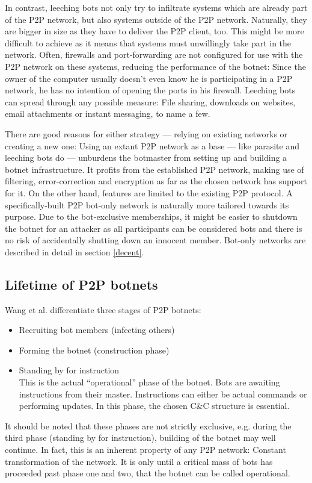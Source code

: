 \documentclass{llncs}
\begin{document}
In contrast, leeching bots not only try to infiltrate systems which
are already part of the P2P network, but also systems outside of the
P2P network. Naturally, they are bigger in size as they have to
deliver the P2P client, too. This might be more difficult to achieve
as it means that systems must unwillingly take part in the
network. Often, firewalls and port-forwarding are not configured for
use with the P2P network on these systems, reducing the performance of
the botnet: Since the owner of the computer usually doesn't even know
he is participating in a P2P network, he has no intention of opening
the ports in his firewall. Leeching bots can spread through any
possible measure: File sharing, downloads on websites, email
attachments or instant messaging, to name a few.

There are good reasons for either strategy --- relying on existing
networks or creating a new one: Using an extant P2P network as a base
--- like parasite and leeching bots do --- unburdens the botmaster
from setting up and building a botnet infrastructure. It profits from
the established P2P network, making use of filtering, error-correction
and encryption as far as the chosen network has support for it. On the
other hand, features are limited to the existing P2P protocol. A
specifically-built P2P bot-only network is naturally more tailored
towards its purpose. Due to the bot-exclusive memberships, it might be
easier to shutdown the botnet for an attacker as all participants can
be considered bots and there is no risk of accidentally shutting down
an innocent member. Bot-only networks are described in detail in
section \ref{decent}.


\subsection{Lifetime of P2P botnets}
Wang et al.\cite{wang2009systematic} differentiate three stages of P2P botnets:
\begin{itemize}
\item Recruiting bot members (infecting others)
\item Forming the botnet (construction phase)
\item Standing by for instruction \\
This is the actual ``operational'' phase of the botnet. Bots are awaiting instructions from their master. Instructions can either be actual commands or performing updates. In this phase, the chosen C\&C structure is essential.
\end{itemize}
It should be noted that these phases are not strictly exclusive,
e.g. during the third phase (standing by for instruction), building of
the botnet may well continue. In fact, this is an inherent property of
any P2P network: Constant transformation of the network. It is only
until a critical mass of bots has proceeded past phase one and two,
that the botnet can be called operational.
\end{document}
